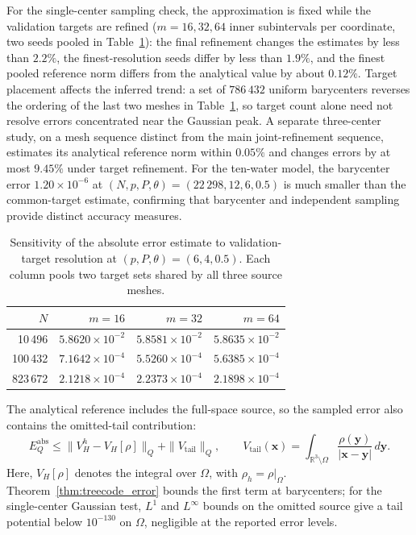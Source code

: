 \documentclass[a4paper,pdflatex,sn-mathphys-num]{sn-jnl}
\theoremstyle{thmstyleone}
\begin{document}
For the single-center sampling check, the approximation is fixed while the validation targets are refined ($m=16,32,64$ inner subintervals per coordinate, two seeds pooled in Table~\ref{tab:target_refinement}): the final refinement changes the estimates by less than $2.2\%$, the finest-resolution seeds differ by less than $1.9\%$, and the finest pooled reference norm differs from the analytical value by about $0.12\%$. Target placement affects the inferred trend: a set of $786\,432$ uniform barycenters reverses the ordering of the last two meshes in Table~\ref{tab:target_refinement}, so target count alone need not resolve errors concentrated near the Gaussian peak. A separate three-center study, on a mesh sequence distinct from the main joint-refinement sequence, estimates its analytical reference norm within $0.05\%$ and changes errors by at most $9.45\%$ under target refinement. For the ten-water model, the barycenter error $1.20\times10^{-6}$ at $(N,p,P,\theta)=(22\,298,12,6,0.5)$ is much smaller than the common-target estimate, confirming that barycenter and independent sampling provide distinct accuracy measures.

\begin{table}[htbp]
\centering
\caption{Sensitivity of the absolute error estimate to validation-target resolution at $(p,P,\theta)=(6,4,0.5)$. Each column pools two target sets shared by all three source meshes.}
\label{tab:target_refinement}
\begin{tabular}{rrrr}
\toprule
$N$ & $m=16$ & $m=32$ & $m=64$\\
\midrule
10\,496  & $5.8620\times10^{-2}$ & $5.8581\times10^{-2}$ & $5.8635\times10^{-2}$\\
100\,432 & $7.1642\times10^{-4}$ & $5.5260\times10^{-4}$ & $5.6385\times10^{-4}$\\
823\,672 & $2.1218\times10^{-4}$ & $2.2373\times10^{-4}$ & $2.1898\times10^{-4}$\\
\bottomrule
\end{tabular}
\end{table}

The analytical reference includes the full-space source, so the sampled error also contains the omitted-tail contribution:
\[
E_Q^{\mathrm{abs}}\leq
\|V_H^h-V_H[\rho]\|_Q+\|V_{\mathrm{tail}}\|_Q,
\qquad
V_{\mathrm{tail}}(\mathbf x)=
\int_{\mathbb R^3\setminus\Omega}
\frac{\rho(\mathbf y)}{|\mathbf x-\mathbf y|}\,d\mathbf y.
\]
Here, $V_H[\rho]$ denotes the integral over $\Omega$, with $\rho_h=\rho|_\Omega$. Theorem~\ref{thm:treecode_error} bounds the first term at barycenters; for the single-center Gaussian test, $L^1$ and $L^\infty$ bounds on the omitted source give a tail potential below $10^{-130}$ on $\Omega$, negligible at the reported error levels.
\end{document}
